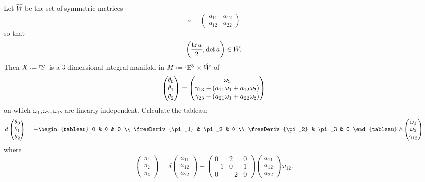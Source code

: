 Let \(\hat{W}\) be the set of symmetric matrices
\[
a=
\begin{pmatrix}
a_{11}&a_{12}\\
a_{12}&a_{22}
\end{pmatrix}
\]
so that 
\[
\left(\frac{\operatorname{tr} a}{2},\det a\right) \in W.
\]
Then \(X\defeq\frameBundle{S}\) is a \(3\)-dimensional integral manifold in \(M\defeq\frameBundleE{3} \times \hat{W}\) of
\[
\begin{pmatrix}
\theta_0 \\
\theta_1 \\
\theta_2
\end{pmatrix}
=
\begin{pmatrix}
\omega_3 \\
\gamma_{13} - \left(a_{11} \omega_1 + a_{12} \omega_2\right) \\
\gamma_{23} - \left(a_{21} \omega_1 + a_{22} \omega_2\right)
\end{pmatrix}
\]
on which \(\omega_1, \omega_2, \omega_{12}\) are linearly independent.
Calculate the tableau:
\[
d
\begin{pmatrix}
\theta_0 \\
\theta_1 \\
\theta_2
\end{pmatrix}
=
-
\begin{tableau}
0 & 0 & 0 \\
\freeDeriv{\pi_1} & \pi_2 & 0 \\
\freeDeriv{\pi_2} & \pi_3 & 0
\end{tableau}
\wedge
\begin{pmatrix}
\omega_1 \\
\omega_2 \\
\gamma_{12}
\end{pmatrix}
\]
where
\[
\begin{pmatrix}
\pi_1 \\
\pi_2 \\
\pi_3
\end{pmatrix}
=
d
\begin{pmatrix}
a_{11} \\
a_{12} \\
a_{22}
\end{pmatrix}
+
\begin{pmatrix}
0 & 2 & 0 \\
-1 & 0 & 1 \\
0 & -2 & 0 
\end{pmatrix}
\begin{pmatrix}
a_{11} \\
a_{12} \\
a_{22}
\end{pmatrix}
\omega_{12}.
\]
